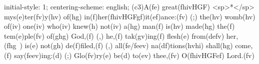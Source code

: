 initial-style: 1;
centering-scheme: english;
(c3)A(fe) great(fhivHGF) <sp>*</sp> mys(e)ter(fv)y(hv) of(hg) in(f)her(fhivHGFgf)it(ef)ance:(fv) (;) the(hv) womb(hv) of(iv) one(iv) who(iv) knew(h) not(iv) a(hg) man(f) is(hv) made(hg) the(f) tem(e)ple(fv) of(ghg) God,(f) (,) he,(f) tak(gv)ing(f) flesh(e) from(defv) her,(fhg~) is(e) not(gh) de(f)filed,(f) (,) all(fe/feev) na(df)tions(hvhi) shall(hg) come,(f) say(feev)ing:(d) (;) Glo(fv)ry(e) be(d) to(ev) thee,(fv) O(fhivHGFef) Lord.(fv)
